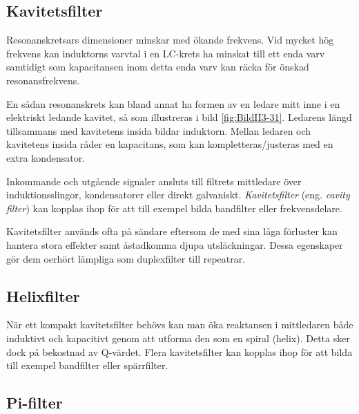 \subsection{Kavitetsfilter}


Resonanskretsars dimensioner minskar med ökande frekvens.
Vid mycket hög frekvens kan induktorns varvtal i en LC-krets ha minskat till
ett enda varv samtidigt som kapacitansen inom detta enda varv kan räcka för
önskad resonansfrekvens.

En sådan resonanskrets kan bland annat ha formen av en ledare mitt inne i en
elektriskt ledande kavitet, så som illustreras i bild \ref{fig:BildII3-31}.
Ledarens längd tillsammans med kavitetens insida bildar induktorn.
Mellan ledaren och kavitetens insida råder en kapacitans, som kan
kompletteras/justeras med en extra kondensator.

Inkommande och utgående signaler ansluts till filtrets mittledare över
induktionsslingor, kondensatorer eller direkt galvaniskt.
\emph{Kavitetsfilter} (eng. \emph{cavity filter}) kan kopplas ihop för att till exempel 
bilda bandfilter eller frekvensdelare.

Kavitetsfilter används ofta på sändare eftersom de med sina låga förluster kan
hantera stora effekter samt åstadkomma djupa utsläckningar.
Dessa egenskaper gör dem oerhört lämpliga som duplexfilter till repeatrar.

\subsection{Helixfilter}

När ett kompakt kavitetsfilter behövs kan man öka reaktansen i mittledaren
både induktivt och kapacitivt genom att utforma den som en spiral (helix).
Detta sker dock på bekostnad av Q-värdet.
Flera kavitetsfilter kan kopplas ihop för att bilda till exempel bandfilter eller spärrfilter.

\subsection{Pi-filter}


